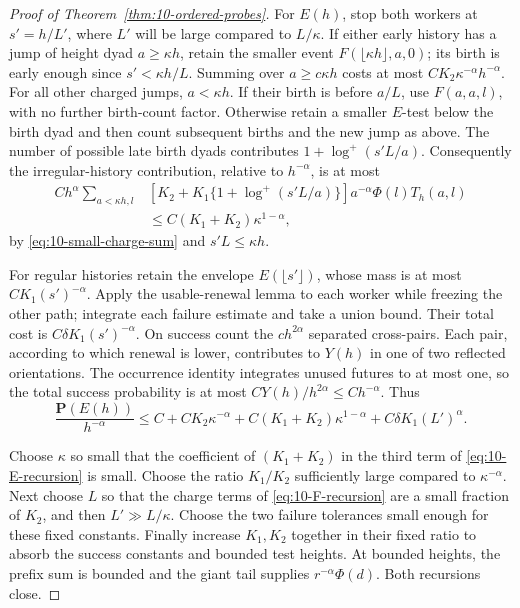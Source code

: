 \begin{proof}[Proof of Theorem~\ref{thm:10-ordered-probes}]
For \(E(h)\), stop both workers at \(s'=h/L'\), where \(L'\) will be
large compared to \(L/\kappa\). If either early history has a jump of
height dyad \(a\ge\kappa h\), retain the smaller event
\(F(\lfloor\kappa h\rfloor,a,0)\); its birth is early enough since
\(s'<\kappa h/L\). Summing over \(a\ge c\kappa h\) costs at most
\(CK_2\kappa^{-\alpha}h^{-\alpha}\).
For all other charged jumps, \(a<\kappa h\). If their birth is before
\(a/L\), use \(F(a,a,l)\), with no further birth-count factor.
Otherwise retain a smaller \(E\)-test below the birth dyad and then
count subsequent births and the new jump as above. The number of
possible late birth dyads contributes
\(1+\log^+(s'L/a)\). Consequently the irregular-history contribution,
relative to \(h^{-\alpha}\), is at most
\begin{align*}
 Ch^\alpha\sum_{a<\kappa h,l}
 &[K_2+K_1\{1+\log^+(s'L/a)\}]
          a^{-\alpha}\Phi(l)T_h(a,l)\\
 &\le C(K_1+K_2)\kappa^{1-\alpha},
\end{align*}
by \eqref{eq:10-small-charge-sum} and \(s'L\le\kappa h\).

For regular histories retain the envelope \(E(\lfloor s'\rfloor)\),
whose mass is at most \(CK_1(s')^{-\alpha}\). Apply the usable-renewal
lemma to each worker while freezing the other path; integrate each
failure estimate and take a union bound. Their total cost is
\(C\delta K_1(s')^{-\alpha}\). On success count the
\(ch^{2\alpha}\) separated cross-pairs. Each pair, according to which
renewal is lower, contributes to \(Y(h)\) in one of two reflected
orientations. The occurrence identity integrates unused futures to at
most one, so the total success probability is at most
\(CY(h)/h^{2\alpha}\le Ch^{-\alpha}\). Thus
\begin{equation}
 \frac{\mathbf P(E(h))}{h^{-\alpha}}
 \le C+CK_2\kappa^{-\alpha}
       +C(K_1+K_2)\kappa^{1-\alpha}
       +C\delta K_1(L')^\alpha.
 \label{eq:10-E-recursion}
\end{equation}

Choose \(\kappa\) so small that the coefficient of
\((K_1+K_2)\) in the third term of \eqref{eq:10-E-recursion} is small.
Choose the ratio \(K_1/K_2\) sufficiently large compared to
\(\kappa^{-\alpha}\). Next choose \(L\) so that the charge terms of
\eqref{eq:10-F-recursion} are a small fraction of \(K_2\), and then
\(L'\gg L/\kappa\). Choose the two failure tolerances small enough
for these fixed constants. Finally increase \(K_1,K_2\) together in
their fixed ratio to absorb the success constants and bounded test
heights. At bounded heights, the prefix sum is bounded and the giant
tail supplies \(r^{-\alpha}\Phi(d)\). Both recursions close.


\end{proof}
